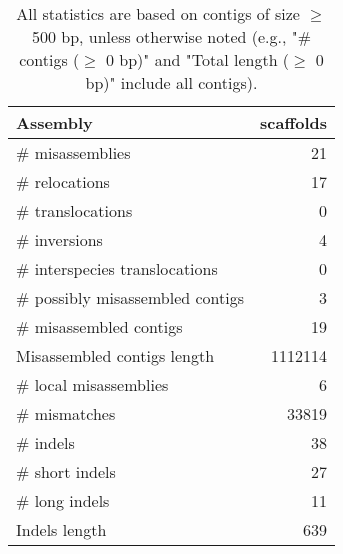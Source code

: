 \documentclass[12pt,a4paper]{article}
\begin{document}
\begin{table}[ht]
\begin{center}
\caption{All statistics are based on contigs of size $\geq$ 500 bp, unless otherwise noted (e.g., "\# contigs ($\geq$ 0 bp)" and "Total length ($\geq$ 0 bp)" include all contigs).}
\begin{tabular}{|l*{1}{|r}|}
\hline
Assembly & scaffolds \\ \hline
\# misassemblies & 21 \\ \hline
\hspace{5mm}\# relocations & 17 \\ \hline
\hspace{5mm}\# translocations & 0 \\ \hline
\hspace{5mm}\# inversions & 4 \\ \hline
\hspace{5mm}\# interspecies translocations & 0 \\ \hline
\# possibly misassembled contigs & 3 \\ \hline
\# misassembled contigs & 19 \\ \hline
Misassembled contigs length & 1112114 \\ \hline
\# local misassemblies & 6 \\ \hline
\# mismatches & 33819 \\ \hline
\# indels & 38 \\ \hline
\hspace{5mm}\# short indels & 27 \\ \hline
\hspace{5mm}\# long indels & 11 \\ \hline
Indels length & 639 \\ \hline
\end{tabular}
\end{center}
\end{table}
\end{document}
